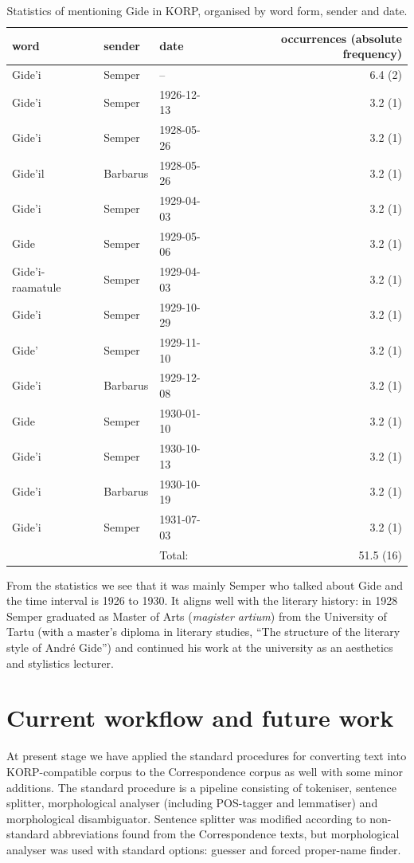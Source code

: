 \documentclass[runningheads]{llncs}
\begin{document}
\begin{table}
\caption{Statistics of mentioning Gide in KORP, organised by word form, sender and date.}\label{tab1}
\begin{tabular}{| l | l | l | r|}
  \hline
  word & sender & date & occurrences (absolute frequency) \\
  \hline
  Gide'i & Semper & -- & 6.4 (2)\\
  Gide'i & Semper & 1926-12-13 & 3.2 (1)\\
  Gide'i & Semper & 1928-05-26 & 3.2 (1)\\
  Gide'il & Barbarus & 1928-05-26 & 3.2 (1)\\
  Gide'i & Semper & 1929-04-03 & 3.2 (1)\\
  Gide & Semper & 1929-05-06 & 3.2 (1)\\
  Gide'i-raamatule & Semper & 1929-04-03 & 3.2 (1)\\
  Gide'i & Semper & 1929-10-29 & 3.2 (1)\\
  Gide' & Semper & 1929-11-10 & 3.2 (1)\\
  Gide'i & Barbarus & 1929-12-08 & 3.2 (1)\\
  Gide & Semper & 1930-01-10 & 3.2 (1)\\
  Gide'i & Semper & 1930-10-13 & 3.2 (1)\\
  Gide'i & Barbarus & 1930-10-19 & 3.2 (1)\\
  Gide'i & Semper & 1931-07-03 & 3.2 (1)\\
  \hline
  &&Total:&51.5 (16)\\
\hline
\end{tabular}
\end{table}


From the statistics we see that it was mainly Semper who talked about Gide and the time interval is 1926 to 1930. It aligns well with the literary history: in 1928 Semper graduated as Master of Arts (\emph{magister artium}) from the University of Tartu (with a master’s diploma in literary studies, ``The structure of the literary style of Andr\'e Gide'') and continued his work at the university as an aesthetics and stylistics lecturer.

\section{Current workflow and future work}

At present stage we have applied the standard procedures for converting text into KORP-compatible corpus to the Correspondence corpus as well with some minor additions.  The standard procedure is a pipeline consisting of tokeniser, sentence splitter, morphological analyser (including POS-tagger and lemmatiser) and morphological disambiguator.  Sentence splitter was modified according to non-standard abbreviations found from the Correspondence texts, but morphological analyser was used with standard options: guesser and forced proper-name finder.
\end{document}
